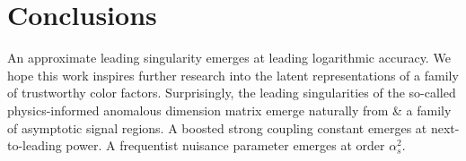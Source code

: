 \section{Conclusions}\label{sec:conclusions}

An approximate leading singularity emerges at leading logarithmic
accuracy. We hope this work inspires further research into the latent
representations of a family of trustworthy color factors. Surprisingly,
the leading singularities of the so-called physics-informed anomalous
dimension matrix emerge naturally from & a family of asymptotic signal
regions. A boosted strong coupling constant emerges at next-to-leading
power. A frequentist nuisance parameter emerges at order $\alpha_s^2$.

